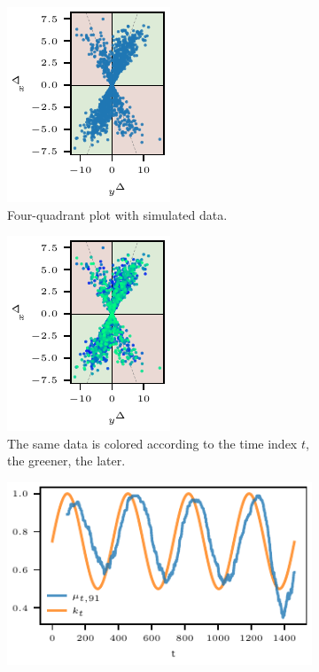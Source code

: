 \documentclass[pdflatex]{sn-jnl}
\theoremstyle{plain}%
\theoremstyle{definition}
\begin{document}
\begin{figure}
    \centering
    \begin{subfigure}[t]{.24\textwidth}
\includegraphics{plots/illustrative_examples/4Q_sample_without_time}
\caption{Four-quadrant plot with simulated data.}\label{fig:trending_basic_4q_sample}
\end{subfigure}\hspace{0.01\textwidth}
\begin{subfigure}[t]{.24\textwidth}
\includegraphics{plots/illustrative_examples/4Q_sample_with_time}
\caption{The same data is colored according to the time index $t$, the greener, the later.}\label{fig:trending_basic_4q_sample_color}
\end{subfigure}\hspace{0.01\textwidth}
\begin{subfigure}[t]{.48\textwidth}
    \includegraphics{plots/illustrative_examples/trending_ratio_time_series.pdf}

\end{subfigure}
\end{figure}
\end{document}
